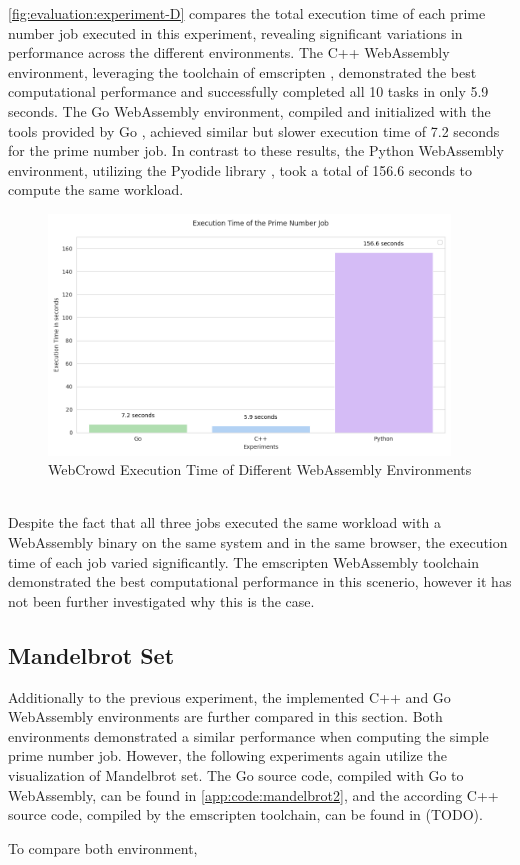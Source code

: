 \autoref{fig:evaluation:experiment-D} compares the total execution time of each prime number job executed in this experiment, revealing significant variations in performance across the different environments. The C++ WebAssembly environment, leveraging the toolchain of emscripten \cite{methodology:emcc}, demonstrated the best computational performance and successfully completed all 10 tasks in only 5.9 seconds. The Go WebAssembly environment, compiled and initialized with the tools provided by Go \cite{methodology:go}, achieved similar but slower execution time of 7.2 seconds for the prime number job. In contrast to these results, the Python WebAssembly environment, utilizing the Pyodide library \cite{methodology:pyodie}, took a total of 156.6 seconds to compute the same workload.
\begin{figure}[htbp]
    \centering
    \includegraphics[width=0.95\textwidth]{gfx/figures/Evaluation_D.png}
    \caption{WebCrowd Execution Time of Different WebAssembly Environments}
    \label{fig:evaluation:experiment-D}
\end{figure}
~\\
Despite the fact that all three jobs executed the same workload with a WebAssembly binary on the same system and in the same browser, the execution time of each job varied significantly. The emscripten \cite{methodology:emcc} WebAssembly toolchain demonstrated the best computational performance in this scenerio, however it has not been further investigated why this is the case.

\subsection{Mandelbrot Set}
Additionally to the previous experiment, the implemented C++ and Go WebAssembly environments are further compared in this section. Both environments demonstrated a similar performance when computing the simple prime number job. However, the following experiments again utilize the visualization of Mandelbrot set. The Go source code, compiled with Go \cite{methodology:go} to WebAssembly, can be found in \autoref{app:code:mandelbrot2}, and the according C++ source code, compiled by the emscripten \cite{methodology:emcc} toolchain, can be found in (TODO).

To compare both environment, 
